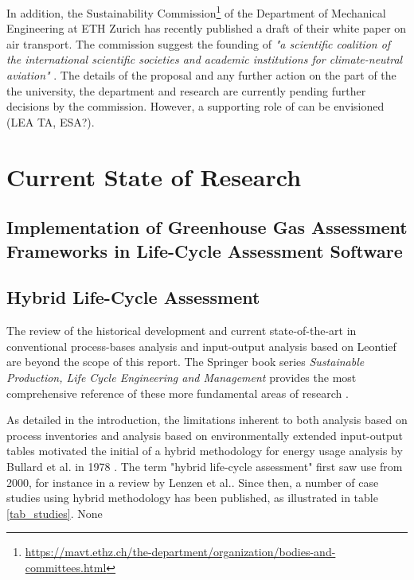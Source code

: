 \documentclass{article}
\begin{document}
    In addition, the Sustainability Commission\footnote{\url{https://mavt.ethz.ch/the-department/organization/bodies-and-committees.html}} of the Department of Mechanical Engineering at ETH Zurich has recently published a draft of their white paper on air transport. The commission suggest the founding of  \textit{"a scientific coalition of the international scientific societies and academic institutions for climate-neutral aviation"} \cite{mazzotti_air_2022}. The details of the proposal and any further action on the part of the the university, the department and research are currently pending further decisions by the commission. However, a supporting role of can be envisioned (LEA TA, ESA?).

\newpage
\section{Current State of Research}

    \subsection{Implementation of Greenhouse Gas Assessment Frameworks in Life-Cycle Assessment Software}

    \subsection{Hybrid Life-Cycle Assessment}
        
        The review of the historical development and current state-of-the-art in conventional process-bases analysis and input-output analysis based on Leontief are beyond the scope of this report. The Springer book series \textit{Sustainable Production, Life Cycle Engineering and Management} provides the most comprehensive reference of these more fundamental areas of research \cite{teuteberg_progress_2019}\cite{albrecht_progress_2021}. 
        
        As detailed in the introduction, the limitations inherent to both analysis based on process inventories and analysis based on environmentally extended input-output tables motivated the initial of a hybrid methodology for energy usage analysis by Bullard et al. in 1978 \cite{bullard_net_1978}. The term "hybrid life-cycle assessment" first saw use from 2000, for instance in a review by Lenzen et al.\cite{lenzen_errors_2000}. Since then, a number of case studies using hybrid methodology has been published, as illustrated in table \ref{tab_studies}. None 
        
\end{document}
